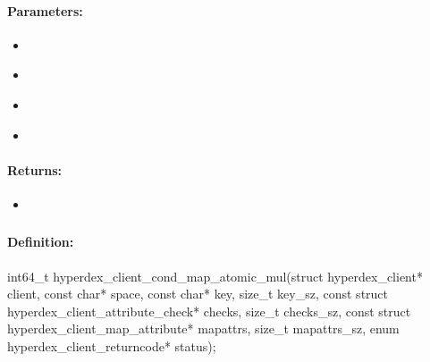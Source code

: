 \paragraph{Parameters:}
\begin{itemize}[noitemsep]
\item {}\\

\item {}\\

\item {}\\

\item {}\\

\end{itemize}

\paragraph{Returns:}
\begin{itemize}[noitemsep]
\item {}\\

\end{itemize}

\pagebreak
\subsubsection{}
\label{api:c:cond_map_atomic_mul}


\paragraph{Definition:}
\begin{ccode}
int64_t hyperdex_client_cond_map_atomic_mul(struct hyperdex_client* client,
        const char* space,
        const char* key, size_t key_sz,
        const struct hyperdex_client_attribute_check* checks, size_t checks_sz,
        const struct hyperdex_client_map_attribute* mapattrs, size_t mapattrs_sz,
        enum hyperdex_client_returncode* status);
\end{ccode}

